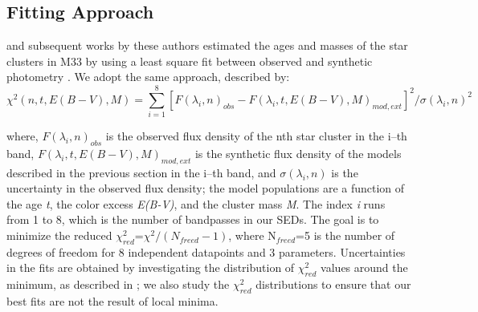\documentclass{aastex63}
\begin{document}
\subsection{Fitting Approach}
\citet{Ma+2001} and subsequent works by these authors estimated the ages and masses of the star clusters in M33 by using a least square fit between observed and synthetic photometry \citep{Kong+2000}. We adopt the same approach, described by:
\begin{equation}
    \chi^{2}(n,t,E(B-V),M) = \sum_{i=1}^{8} [F(\lambda_i, n)_{obs} - F(\lambda_{i},t,E(B-V),M)_{mod,ext}]^{2}/\sigma(\lambda_i, n)^2
    \label{Eq16}
\end{equation}

\noindent where, $F(\lambda_{i}, n)_{obs}$ is the observed flux density of the nth star cluster in the i--th band, $F(\lambda_{i},t,E(B-V),M)_{mod,ext}$ is the synthetic flux density of the models described in the previous section in the i--th band, and $\sigma(\lambda_i, n)$ is the uncertainty in the observed flux density; the model populations are a function of the age \textit{t}, the color excess \textit{E(B-V)}, and the cluster mass \textit{M}. The index \textit{i} runs from 1 to 8, which is the number of bandpasses in our SEDs. The goal is to minimize the reduced $\chi^2_{red}$=$\chi^2/(N_{freed}-1)$, where N$_{freed}$=5 is the number of degrees of freedom for 8 independent datapoints and 3 parameters. Uncertainties in the fits are obtained by investigating the distribution of $\chi^2_{red}$ values around the minimum, as described in \citet{Calzetti+2021}; we also study the $\chi^2_{red}$ distributions to ensure that our best fits are not the result of local minima.
\end{document}
